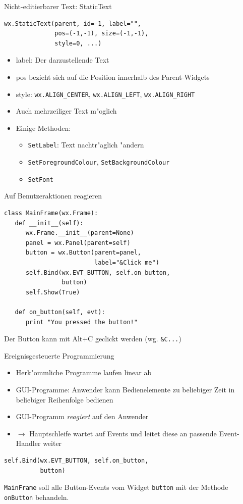 \begin{frame}[fragile]{Nicht-editierbarer Text: StaticText}
\begin{lstlisting}[style=Python]
wx.StaticText(parent, id=-1, label="", 
              pos=(-1,-1), size=(-1,-1), 
              style=0, ...)
\end{lstlisting}
\begin{itemize}
\item \alert{label}: Der darzustellende Text
\item \alert{pos} bezieht sich auf die Position innerhalb des Parent-Widgets
\item \alert{style}: \lstinline{wx.ALIGN_CENTER}, \lstinline{wx.ALIGN_LEFT}, \lstinline{wx.ALIGN_RIGHT}
\item Auch mehrzeiliger Text m"oglich
\item Einige Methoden:
\begin{itemize}
\item \lstinline{SetLabel}: Text nachtr"aglich "andern
\item \lstinline{SetForegroundColour}, \lstinline{SetBackgroundColour}
\item \lstinline{SetFont}
\end{itemize}
\end{itemize}
\end{frame}

\begin{frame}[fragile]{Auf Benutzeraktionen reagieren}
\begin{lstlisting}[style=Python]
class MainFrame(wx.Frame):
   def __init__(self):
      wx.Frame.__init__(parent=None)
      panel = wx.Panel(parent=self)
      button = wx.Button(parent=panel,
                         label="&Click me")
      self.Bind(wx.EVT_BUTTON, self.on_button,
                button)
      self.Show(True)

   def on_button(self, evt):
      print "You pressed the button!"
\end{lstlisting}
Der Button kann mit Alt+C \glqq geclickt\grqq{} werden (wg. \lstinline{&C...})
\end{frame}

\begin{frame}[fragile]{Ereignisgesteuerte Programmierung}
\begin{itemize}
\item Herk"ommliche Programme laufen linear ab
\item GUI-Programme: Anwender kann Bedienelemente zu beliebiger Zeit in beliebiger Reihenfolge bedienen
\item GUI-Programm \emph{reagiert} auf den Anwender
\item $\rightarrow$ \alert{Hauptschleife} wartet auf \alert{Events} und leitet diese an passende \alert{Event-Handler} weiter
\end{itemize}
\begin{lstlisting}[style=Python]
self.Bind(wx.EVT_BUTTON, self.on_button, 
          button)
\end{lstlisting}
\lstinline{MainFrame} soll alle Button-Events vom Widget {\lstinline{button}} mit der Methode \lstinline{onButton} behandeln.
\end{frame}

